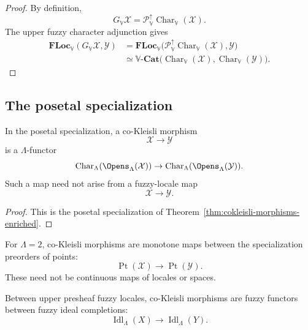 \begin{proof}
By definition,
\[
    G_{\mathbb V}\mathcal X
    =
    \mathcal P_{\mathbb V}^{\uparrow}
    \operatorname{Char}_{\mathbb V}(\mathcal X).
\]
The upper fuzzy character adjunction gives
\[
\begin{aligned}
    \mathbf{FLoc}_{\mathbb V}(G_{\mathbb V}\mathcal X,\mathcal Y)
    &=
    \mathbf{FLoc}_{\mathbb V}
    \bigl(
        \mathcal P_{\mathbb V}^{\uparrow}
        \operatorname{Char}_{\mathbb V}(\mathcal X),
        \mathcal Y
    \bigr)\\
    &\simeq
    \mathbb V\text{-}\mathbf{Cat}
    \bigl(
        \operatorname{Char}_{\mathbb V}(\mathcal X),
        \operatorname{Char}_{\mathbb V}(\mathcal Y)
    \bigr).
\end{aligned}
\]
\end{proof}

\subsection{The posetal specialization}
\label{subsec:cokleisli-posetal}

\begin{corollary}
\label{cor:posetal-cokleisli-morphisms}
In the posetal specialization, a co-Kleisli morphism
\[
    \mathcal X\to\mathcal Y
\]
is a \(\Lambda\)-functor
\[
    \operatorname{Char}_\Lambda(\Opens_\Lambda(\mathcal X))
    \to
    \operatorname{Char}_\Lambda(\Opens_\Lambda(\mathcal Y)).
\]
Such a map need not arise from a fuzzy-locale map
\[
    \mathcal X\to\mathcal Y.
\]
\end{corollary}

\begin{proof}
This is the posetal specialization of
Theorem~\ref{thm:cokleisli-morphisms-enriched}.
\end{proof}

\begin{example}
\label{ex:crisp-cokleisli}
For \(\Lambda=2\), co-Kleisli morphisms are monotone maps between the specialization
preorders of points:
\[
    \operatorname{Pt}(\mathcal X)
    \to
    \operatorname{Pt}(\mathcal Y).
\]
These need not be continuous maps of locales or spaces.
\end{example}

\begin{example}
\label{ex:presheaf-fuzzy-locale-cokleisli}
Between upper presheaf fuzzy locales, co-Kleisli morphisms are fuzzy functors
between fuzzy ideal completions:
\[
    \operatorname{Idl}_\Lambda(X)\to\operatorname{Idl}_\Lambda(Y).
\]
\end{example}

